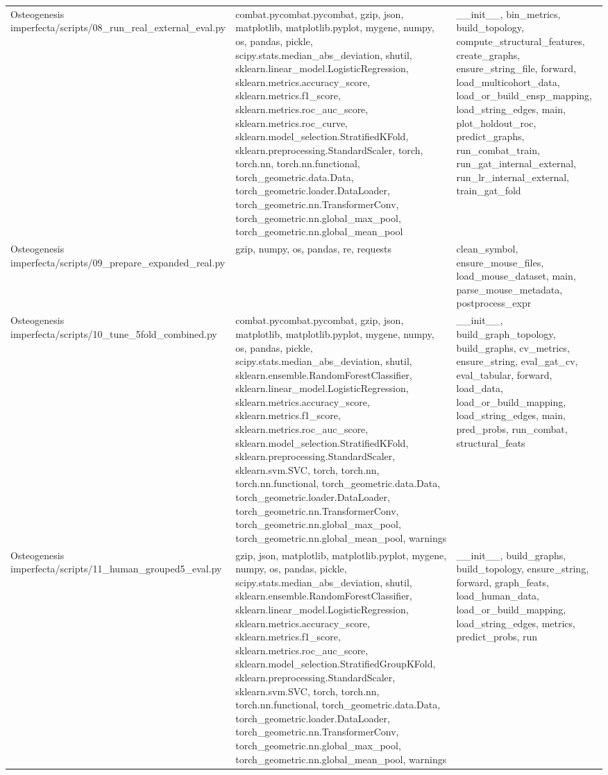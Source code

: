 \documentclass[11pt]{article}
\begin{document}
\begin{longtable}{p{}p{}p{}}
Osteogenesis imperfecta/scripts/08\_run\_real\_external\_eval.py & combat.pycombat.pycombat, gzip, json, matplotlib, matplotlib.pyplot, mygene, numpy, os, pandas, pickle, scipy.stats.median\_abs\_deviation, shutil, sklearn.linear\_model.LogisticRegression, sklearn.metrics.accuracy\_score, sklearn.metrics.f1\_score, sklearn.metrics.roc\_auc\_score, sklearn.metrics.roc\_curve, sklearn.model\_selection.StratifiedKFold, sklearn.preprocessing.StandardScaler, torch, torch.nn, torch.nn.functional, torch\_geometric.data.Data, torch\_geometric.loader.DataLoader, torch\_geometric.nn.TransformerConv, torch\_geometric.nn.global\_max\_pool, torch\_geometric.nn.global\_mean\_pool & \_\_init\_\_, bin\_metrics, build\_topology, compute\_structural\_features, create\_graphs, ensure\_string\_file, forward, load\_multicohort\_data, load\_or\_build\_ensp\_mapping, load\_string\_edges, main, plot\_holdout\_roc, predict\_graphs, run\_combat\_train, run\_gat\_internal\_external, run\_lr\_internal\_external, train\_gat\_fold \\
Osteogenesis imperfecta/scripts/09\_prepare\_expanded\_real.py & gzip, numpy, os, pandas, re, requests & clean\_symbol, ensure\_mouse\_files, load\_mouse\_dataset, main, parse\_mouse\_metadata, postprocess\_expr \\
Osteogenesis imperfecta/scripts/10\_tune\_5fold\_combined.py & combat.pycombat.pycombat, gzip, json, matplotlib, matplotlib.pyplot, mygene, numpy, os, pandas, pickle, scipy.stats.median\_abs\_deviation, shutil, sklearn.ensemble.RandomForestClassifier, sklearn.linear\_model.LogisticRegression, sklearn.metrics.accuracy\_score, sklearn.metrics.f1\_score, sklearn.metrics.roc\_auc\_score, sklearn.model\_selection.StratifiedKFold, sklearn.preprocessing.StandardScaler, sklearn.svm.SVC, torch, torch.nn, torch.nn.functional, torch\_geometric.data.Data, torch\_geometric.loader.DataLoader, torch\_geometric.nn.TransformerConv, torch\_geometric.nn.global\_max\_pool, torch\_geometric.nn.global\_mean\_pool, warnings & \_\_init\_\_, build\_graph\_topology, build\_graphs, cv\_metrics, ensure\_string, eval\_gat\_cv, eval\_tabular, forward, load\_data, load\_or\_build\_mapping, load\_string\_edges, main, pred\_probs, run\_combat, structural\_feats \\
Osteogenesis imperfecta/scripts/11\_human\_grouped5\_eval.py & gzip, json, matplotlib, matplotlib.pyplot, mygene, numpy, os, pandas, pickle, scipy.stats.median\_abs\_deviation, shutil, sklearn.ensemble.RandomForestClassifier, sklearn.linear\_model.LogisticRegression, sklearn.metrics.accuracy\_score, sklearn.metrics.f1\_score, sklearn.metrics.roc\_auc\_score, sklearn.model\_selection.StratifiedGroupKFold, sklearn.preprocessing.StandardScaler, sklearn.svm.SVC, torch, torch.nn, torch.nn.functional, torch\_geometric.data.Data, torch\_geometric.loader.DataLoader, torch\_geometric.nn.TransformerConv, torch\_geometric.nn.global\_max\_pool, torch\_geometric.nn.global\_mean\_pool, warnings & \_\_init\_\_, build\_graphs, build\_topology, ensure\_string, forward, graph\_feats, load\_human\_data, load\_or\_build\_mapping, load\_string\_edges, metrics, predict\_probs, run \\

\end{longtable}
\end{document}
